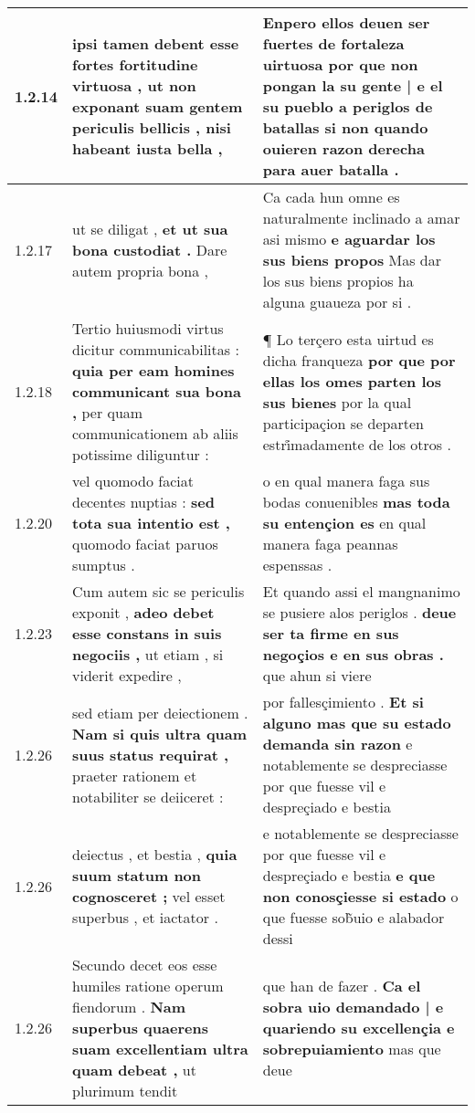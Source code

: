 \begin{tabular}{|p{1cm}|p{6.5cm}|p{6.5cm}|}
1.2.14 & ipsi tamen debent esse fortes fortitudine virtuosa , \textbf{ ut non exponant suam gentem periculis bellicis , } nisi habeant iusta bella , & Enpero ellos deuen ser fuertes de fortaleza uirtuosa \textbf{ por que non pongan la su gente | e el su pueblo a periglos de batallas } si non quando ouieren razon derecha para auer batalla . \\\hline
1.2.17 & ut se diligat , \textbf{ et ut sua bona custodiat . } Dare autem propria bona , & Ca cada hun omne es naturalmente inclinado a amar asi mismo \textbf{ e aguardar los sus biens propos } Mas dar los sus biens propios ha alguna guaueza por si . \\\hline
1.2.18 & Tertio huiusmodi virtus dicitur communicabilitas : \textbf{ quia per eam homines communicant sua bona , } per quam communicationem ab aliis potissime diliguntur : & ¶ Lo terçero esta uirtud es dicha franqueza \textbf{ por que por ellas los omes parten los sus bienes } por la qual participaçion se departen estri̊madamente de los otros . \\\hline
1.2.20 & vel quomodo faciat decentes nuptias : \textbf{ sed tota sua intentio est , } quomodo faciat paruos sumptus . & o en qual manera faga sus bodas conuenibles \textbf{ mas toda su entençion es } en qual manera faga peannas espenssas . \\\hline
1.2.23 & Cum autem sic se periculis exponit , \textbf{ adeo debet esse constans in suis negociis , } ut etiam , si viderit expedire , & Et quando assi el mangnanimo se pusiere alos periglos . \textbf{ deue ser ta firme en sus negoçios e en sus obras . } que ahun si viere \\\hline
1.2.26 & sed etiam per deiectionem . \textbf{ Nam si quis ultra quam suus status requirat , } praeter rationem et notabiliter se deiiceret : & por fallesçimiento . \textbf{ Et si alguno mas que su estado demanda sin razon } e notablemente se despreciasse por que fuesse vil e despreçiado e bestia \\\hline
1.2.26 & deiectus , et bestia , \textbf{ quia suum statum non cognosceret ; } vel esset superbus , et iactator . & e notablemente se despreciasse por que fuesse vil e despreçiado e bestia \textbf{ e que non conosçiesse si estado } o que fuesse sob̃uio e alabador dessi \\\hline
1.2.26 & Secundo decet eos esse humiles ratione operum fiendorum . \textbf{ Nam superbus quaerens suam excellentiam ultra quam debeat , } ut plurimum tendit & que han de fazer . \textbf{ Ca el sobra uio demandado | e quariendo su excellençia e sobrepuiamiento } mas que deue \\\hline

\end{tabular}
